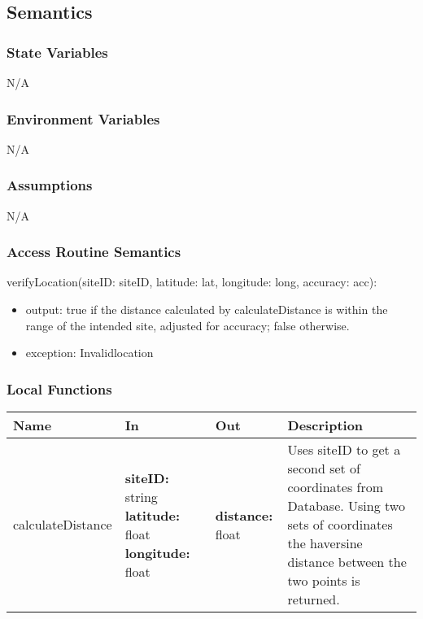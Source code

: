 \documentclass[12pt, titlepage]{article}
\begin{document}
\subsection{Semantics}

\subsubsection{State Variables}

N/A

\subsubsection{Environment Variables}

N/A

\subsubsection{Assumptions}

N/A

\subsubsection{Access Routine Semantics}

\noindent verifyLocation(siteID: siteID, latitude: lat, longitude:
long, accuracy: acc):
\begin{itemize}
  \item output: true if the distance calculated by calculateDistance
    is within the range of the intended site, adjusted for accuracy;
    false otherwise.
  \item exception: Invalidlocation
\end{itemize}

\subsubsection{Local Functions}

\begin{center}
  \begin{tabular}{>{\raggedright}p{3cm} >{\raggedright}p{4cm}
    >{\raggedright}p{4cm} p{4.5cm}}
    \hline
    \textbf{Name} & \textbf{In} & \textbf{Out} & \textbf{Description} \\
    \hline
    calculateDistance & \textbf{siteID:} string \newline
    \textbf{latitude:} float \newline
    \textbf{longitude:} float & \textbf{distance:} float &
    Uses siteID to get a second set of coordinates from Database.
    Using two sets of coordinates the haversine distance between the
    two points is returned. \\
    \hline
  \end{tabular}
\end{center}
\end{document}
